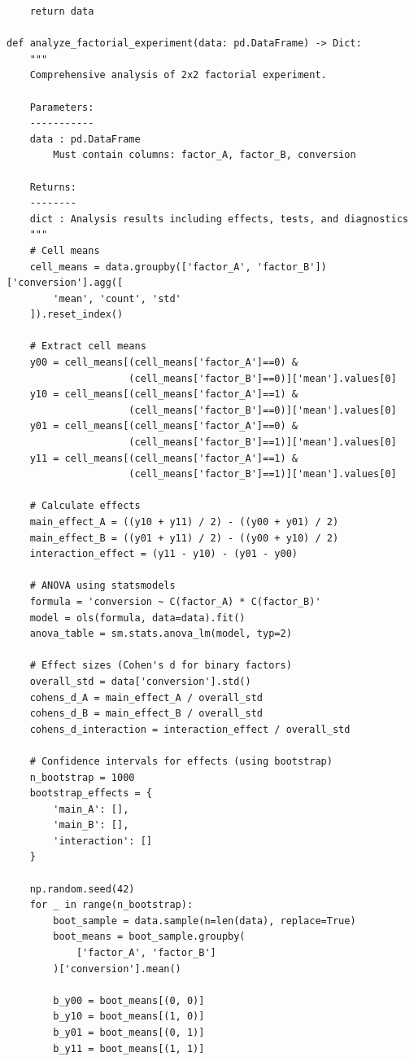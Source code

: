 \begin{lstlisting}
    return data

def analyze_factorial_experiment(data: pd.DataFrame) -> Dict:
    """
    Comprehensive analysis of 2x2 factorial experiment.

    Parameters:
    -----------
    data : pd.DataFrame
        Must contain columns: factor_A, factor_B, conversion

    Returns:
    --------
    dict : Analysis results including effects, tests, and diagnostics
    """
    # Cell means
    cell_means = data.groupby(['factor_A', 'factor_B'])['conversion'].agg([
        'mean', 'count', 'std'
    ]).reset_index()

    # Extract cell means
    y00 = cell_means[(cell_means['factor_A']==0) &
                     (cell_means['factor_B']==0)]['mean'].values[0]
    y10 = cell_means[(cell_means['factor_A']==1) &
                     (cell_means['factor_B']==0)]['mean'].values[0]
    y01 = cell_means[(cell_means['factor_A']==0) &
                     (cell_means['factor_B']==1)]['mean'].values[0]
    y11 = cell_means[(cell_means['factor_A']==1) &
                     (cell_means['factor_B']==1)]['mean'].values[0]

    # Calculate effects
    main_effect_A = ((y10 + y11) / 2) - ((y00 + y01) / 2)
    main_effect_B = ((y01 + y11) / 2) - ((y00 + y10) / 2)
    interaction_effect = (y11 - y10) - (y01 - y00)

    # ANOVA using statsmodels
    formula = 'conversion ~ C(factor_A) * C(factor_B)'
    model = ols(formula, data=data).fit()
    anova_table = sm.stats.anova_lm(model, typ=2)

    # Effect sizes (Cohen's d for binary factors)
    overall_std = data['conversion'].std()
    cohens_d_A = main_effect_A / overall_std
    cohens_d_B = main_effect_B / overall_std
    cohens_d_interaction = interaction_effect / overall_std

    # Confidence intervals for effects (using bootstrap)
    n_bootstrap = 1000
    bootstrap_effects = {
        'main_A': [],
        'main_B': [],
        'interaction': []
    }

    np.random.seed(42)
    for _ in range(n_bootstrap):
        boot_sample = data.sample(n=len(data), replace=True)
        boot_means = boot_sample.groupby(
            ['factor_A', 'factor_B']
        )['conversion'].mean()

        b_y00 = boot_means[(0, 0)]
        b_y10 = boot_means[(1, 0)]
        b_y01 = boot_means[(0, 1)]
        b_y11 = boot_means[(1, 1)]


\end{lstlisting}
